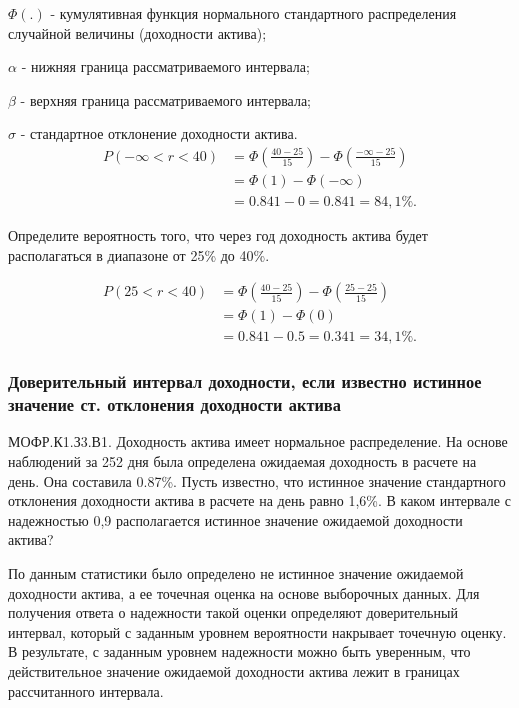 \documentclass[12pt, table, a4paper,twoside]{exam}
\begin{document}
\begin{questions}
\begin{subparts}
\begin{solution}[12em]
		$\Phi(.) $ - кумулятивная функция нормального стандартного распределения случайной величины (доходности актива);
		
		$\alpha $ - нижняя граница рассматриваемого интервала;
		
		$\beta $ - верхняя граница рассматриваемого интервала;
		
		$\sigma $ - стандартное отклонение доходности актива.
		\begin{align*}
		P(-\infty < r < 40)&=\Phi\left(\frac{40-25}{15}\right)-\Phi\left(\frac{-\infty-25}{15}\right)\\
		&=\Phi(1)-\Phi(-\infty)\\
		&=0.841-0=0.841=84,1\%.
		\end{align*}
	\end{solution}
	
	\subpart[5] Определите вероятность того, что через год доходность актива будет располагаться в диапазоне от 25\% до 40\%. 
	
	\begin{solution}[12em]
		\begin{align*}
		P(25 < r < 40)&=\Phi\left(\frac{40-25}{15}\right)-\Phi\left(\frac{25-25}{15}\right)\\
		&=\Phi(1)-\Phi(0)\\
		&=0.841-0.5=0.341=34,1\%.
		\end{align*}
	\end{solution}
\end{subparts}
\addpoints

\subsubsection{Доверительный интервал доходности, если известно истинное значение ст. отклонения доходности актива}
\question[10] МОФР.К1.З3.В1. Доходность актива имеет нормальное распределение. На основе наблюдений за 252 дня была определена ожидаемая доходность в расчете на день. Она составила 0.87\%. Пусть известно, что истинное значение стандартного отклонения доходности актива в расчете на день равно 1,6\%. В каком интервале с надежностью 0,9 располагается истинное значение ожидаемой доходности актива?

\begin{solution}[4em]
	
	\raggedright
	По данным статистики было определено не истинное значение ожидаемой доходности актива, а ее точечная оценка на основе выборочных данных. Для получения ответа о надежности такой оценки определяют доверительный интервал, который с заданным уровнем вероятности накрывает точечную оценку. В результате, с заданным уровнем надежности можно быть уверенным, что действительное значение ожидаемой доходности актива лежит в границах рассчитанного интервала.
	

\end{solution}
\end{questions}
\end{document}
